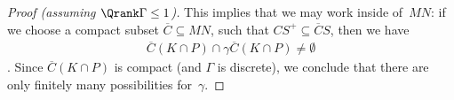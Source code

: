 \begin{proof}[Proof \normalfont (assuming $\Qrank \Gamma \le 1$)]
This implies that we may work inside of~$MN$: if we choose a compact subset $\overline{C} \subseteq MN$, such that 
	$C S^+ \subseteq \overline{C} S$, 
then we have
	\begin{align} \label{SiegelInP}
	\overline{C} (K \cap P) \cap \gamma \overline{C} (K \cap P) \neq \emptyset 
	\end{align}
. 
Since $\overline{C} (K \cap P)$ is compact (and $\Gamma$ is discrete), we conclude that there are only finitely many possibilities for~$\gamma$.
%
%

\end{proof}
